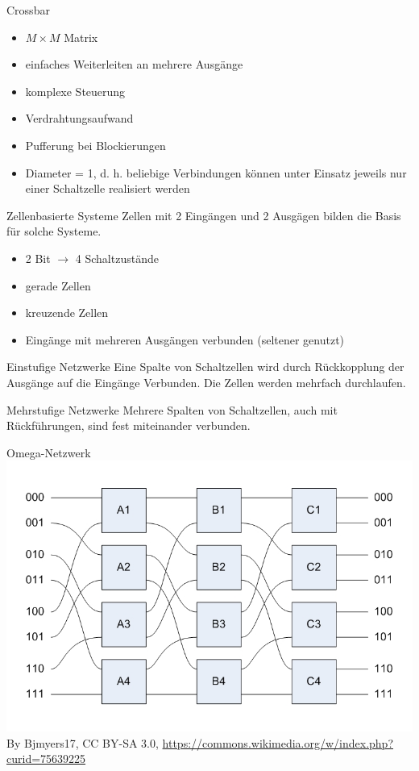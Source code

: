 \begin{defi}{Crossbar}
    \begin{itemize}
        \item $M \times M$ Matrix
        \item einfaches Weiterleiten an mehrere Ausgänge
        \item komplexe Steuerung
        \item Verdrahtungsaufwand
        \item Pufferung bei Blockierungen
        \item Diameter = 1, d. h. beliebige Verbindungen können unter Einsatz jeweils nur einer Schaltzelle realisiert werden
    \end{itemize}
\end{defi}

\begin{defi}{Zellenbasierte Systeme}
    Zellen mit 2 Eingängen und 2 Ausgägen bilden die Basis für solche Systeme.
    \begin{itemize}
        \item 2 Bit $\to$ 4 Schaltzustände
        \item gerade Zellen
        \item kreuzende Zellen
        \item Eingänge mit mehreren Ausgängen verbunden (seltener genutzt)
    \end{itemize}
\end{defi}

\begin{defi}{Einstufige Netzwerke}
    Eine Spalte von Schaltzellen wird durch Rückkopplung der Ausgänge auf die Eingänge Verbunden. 
    Die Zellen werden mehrfach durchlaufen.
\end{defi}

\begin{defi}{Mehrstufige Netzwerke}
    Mehrere Spalten von Schaltzellen, auch mit Rückführungen, 
    sind fest miteinander verbunden.
\end{defi}

\begin{defi}{Omega-Netzwerk}
    \includegraphics[width=\textwidth]{includes/graphics/OmegaNetwork.jpg}
    By Bjmyers17, CC BY-SA 3.0, \url{https://commons.wikimedia.org/w/index.php?curid=75639225}
\end{defi}


